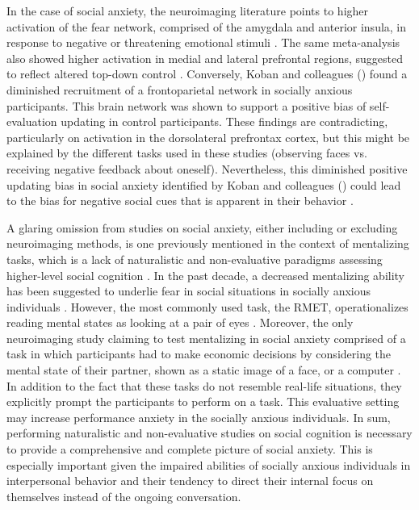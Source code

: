 In the case of social anxiety, the neuroimaging literature points to higher activation of the fear network, comprised of the amygdala and anterior insula, in response to negative or threatening emotional stimuli \citep{bruhl2014,etkin2007}. The same meta-analysis also showed higher activation in medial and lateral prefrontal regions, suggested to reflect altered top-down control \citep{bruhl2014}. Conversely, Koban and colleagues (\citeyear{koban2023}) found a diminished recruitment of a frontoparietal network in socially anxious participants. This brain network was shown to support a positive bias of self-evaluation updating in control participants. These findings are contradicting, particularly on activation in the dorsolateral prefrontax cortex, but this might be explained by the different tasks used in these studies (observing faces vs. receiving negative feedback about oneself). Nevertheless, this diminished positive updating bias in social anxiety identified by Koban and colleagues (\citeyear{koban2023}) could lead to the bias for negative social cues that is apparent in their behavior \citep{alvi2020}.

A glaring omission from studies on social anxiety, either including or excluding neuroimaging methods, is one previously mentioned in the context of mentalizing tasks, which is a lack of naturalistic and non-evaluative paradigms assessing higher-level social cognition \citep{freitas-ferrari2010}. In the past decade, a decreased mentalizing ability has been suggested to underlie fear in social situations in socially anxious individuals \citep{hezel2014}. However, the most commonly used task, the RMET, operationalizes reading mental states as looking at a pair of eyes \citep[for a review]{baez2023}. Moreover, the only neuroimaging study claiming to test mentalizing in social anxiety comprised of a task in which participants had to make economic decisions by considering the mental state of their partner, shown as a static image of a face, or a computer \citep{sripada2009}. In addition to the fact that these tasks do not resemble real-life situations, they explicitly prompt the participants to perform on a task. This evaluative setting may increase performance anxiety in the socially anxious individuals. In sum, performing naturalistic and non-evaluative studies on social cognition is necessary to provide a comprehensive and complete picture of social anxiety. This is especially important given the impaired abilities of socially anxious individuals in interpersonal behavior and their tendency to direct their internal focus on themselves instead of the ongoing conversation.


